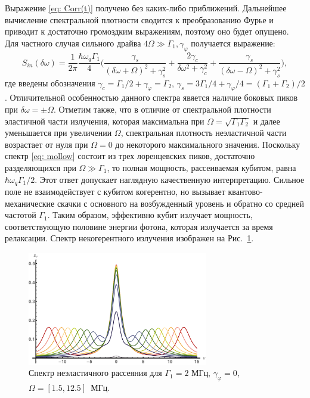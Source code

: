 Выражение \eqref{eq: Corr(t)} получено без каких-либо приближений. Дальнейшее вычисление спектральной плотности сводится к преобразованию Фурье и приводит к достаточно громоздким выражениям, поэтому оно будет опущено. Для частного случая сильного драйва $4\Omega \gg \Gamma_1, \gamma_\varphi$ получается выражение:
\begin{equation}
S_{in}(\delta\omega) = \frac{1}{2\pi}\frac{\hbar \omega_q\Gamma_1}{4}\Big(\frac{\gamma_s}{(\delta\omega+\Omega)^2+\gamma_s^2}+\frac{2\gamma_c}{\delta\omega^2+\gamma_c^2}+\frac{\gamma_s}{(\delta\omega-\Omega)^2+\gamma_s^2}\Big),
\label{eq: mollow}
\end{equation}
где введены обозначения $\gamma_c = \Gamma_1/2 + \gamma_\varphi = \Gamma_2$, $\gamma_s = 3\Gamma_1/4 + \gamma_\varphi/4 = (\Gamma_1 + \Gamma_2)/2$.
Отличительной особенностью данного спектра явяется наличие боковых пиков при $\delta\omega = \pm \Omega$. Отметим также, что в отличие от спектральной плотности эластичной части излучения, которая максимальна при $\Omega = \sqrt{\Gamma_1 \Gamma_2}$ и далее уменьшается при увеличении $\Omega$, спектральная плотность неэластичной части возрастает от нуля при $\Omega = 0 $ до некоторого максимального значения. Поскольку спектр \eqref{eq: mollow} состоит из трех лоренцевских пиков, достаточно разделяющихся при $\Omega \gg \Gamma_1$, то полная мощность, рассеиваемая кубитом, равна $\hbar \omega_q \Gamma_1/2$. Этот ответ допускает наглядную качественную интерпретацию. Сильное поле не взаимодействует с кубитом когерентно, но вызывает квантово-механические скачки с основного на возбужденный уровень и обратно со средней частотой $\Gamma_1$. Таким образом, эффективно кубит излучает мощность, соответствующую половине энергии фотона, которая излучается за время релаксации. Спектр некогерентного излучения изображен на Рис.~\ref{fig: Mollow}.
\begin{figure}[th]
	\centering
	\includegraphics[width=0.7\textwidth]{images/Mollow.pdf}
	\caption[Спектр резонансной флуоресценции.]{Спектр неэластичного рассеяния для $\Gamma_1 = 2$ МГц, $\gamma_\varphi=0$, $\Omega = [1.5, 12.5]$~МГц. }
	\label{fig: Mollow}
\end{figure}

